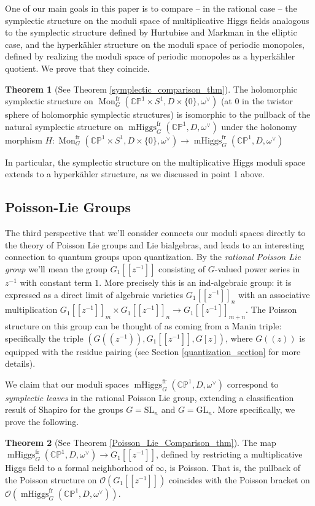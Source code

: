 \documentclass[11pt, oneside, reqno]{amsart}
\theoremstyle{definition} \newtheorem{definition}{Definition}[section]
\newtheorem{theorem}[definition]{Theorem}
\theoremstyle{definition} \newtheorem{remark}[definition]{Remark}
\theoremstyle{definition} \newtheorem{remarks}[definition]{Remarks}
\theoremstyle{definition} \newtheorem{question}[definition]{Question}
\theoremstyle{definition} \newtheorem*{note}{Note}
\theoremstyle{definition} \newtheorem{example}[definition]{Example}
\theoremstyle{definition} \newtheorem{examples}[definition]{Examples}
\newcommand{\bb}[1]{\mathbb{#1}}
\newcommand{\OO}{\mathcal{O}}
\newcommand{\SL}{\mathrm{SL}}
\newcommand{\GL}{\mathrm{GL}}
\DeclareMathOperator{\mhiggs}{mHiggs}
\DeclareMathOperator{\mon}{Mon}
\newcommand{\fr}{\mathrm{fr}}
\begin{document}
One of our main goals in this paper is to compare -- in the rational case -- the symplectic structure on the moduli space of multiplicative Higgs fields analogous to the symplectic structure defined by Hurtubise and Markman in the elliptic case, and the hyperk\"ahler structure on the moduli space of periodic monopoles, defined by realizing the moduli space of periodic monopoles as a hyperk\"ahler quotient.  We prove that they coincide.

\begin{theorem}[See Theorem \ref{symplectic_comparison_thm}]
  The holomorphic symplectic structure on
  $\mon_G^\fr(\bb{CP}^1 \times S^1,D \times\{0\},\omega^\vee)$ (at 0
  in the twistor sphere of holomorphic symplectic structures) 
  is isomorphic to the pullback of the natural symplectic structure on
  $\mhiggs_G^{\text{fr}}(\bb{CP}^1,D,\omega^\vee)$ under the
  holonomy morphism $H \colon \mon_G^\fr(\bb{CP}^1 \times S^1,D \times\{0\},\omega^\vee) \to \mhiggs_G^{\text{fr}}(\bb{CP}^1,D,\omega^\vee)$  
\end{theorem}

In particular, the symplectic structure on the multiplicative Higgs moduli space extends to a hyperk\"ahler structure, as we discussed in point 1 above.

\subsection{Poisson-Lie Groups}
The third perspective that we'll consider connects our moduli spaces directly to the theory of Poisson Lie groups and Lie bialgebras, and leads to an interesting connection to quantum groups upon quantization.  By the \emph{rational Poisson Lie group} we'll mean the group $G_1[[z^{-1}]]$ consisting of $G$-valued power series in $z^{-1}$ with constant term $1$.  More precisely this is an ind-algebraic group: it is expressed as a direct limit of algebraic varieties $G_1[[z^{-1}]]_n$ with an associative multiplication $G_1[[z^{-1}]]_m \times G_1[[z^{-1}]]_n \to G_1[[z^{-1}]]_{m+n}$.  The Poisson structure on this group can be thought of as coming from a Manin triple: specifically the triple $(G(\!(z^{-1})\!), G_1[[z^{-1}]], G[z])$, where $G(\!(z)\!)$ is equipped with the residue pairing (see Section \ref{quantization_section} for more details).  

We claim that our moduli spaces $\mhiggs_G^{\text{fr}}(\bb{CP}^1,D,\omega^\vee)$ correspond to \emph{symplectic leaves} in the rational Poisson Lie group, extending a classification result of Shapiro \cite{Shapiro} for the groups $G = \SL_n$ and $G = \GL_n$.  More specifically, we prove the following.
\begin{theorem}[See Theorem \ref{Poisson_Lie_Comparison_thm}]
The map $\mhiggs^\fr_G(\bb{CP}^1,D,\omega^\vee) \to G_1[[z^{-1}]]$, defined by restricting a multiplicative Higgs field to a formal neighborhood of $\infty$, is Poisson.  That is, the pullback of the Poisson structure on $\OO(G_1[[z^{-1}]])$ coincides with the Poisson bracket on $\OO(\mhiggs^\fr_G(\bb{CP}^1,D,\omega^\vee))$. 
\end{theorem}
\end{document}
